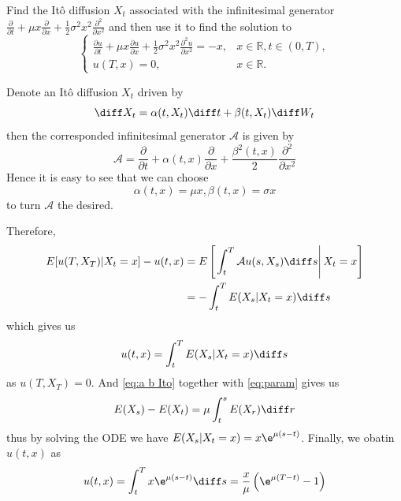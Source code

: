 \problem
\begin{question}
    Find the It\^o diffusion $X_t$ associated with the infinitesimal generator $\frac{\partial }{\partial t}+\mu x \frac{\partial }{\partial x}+\frac{1}{2}\sigma^2x^2 \frac{\partial^2}{\partial x^2}$ and then use it to find the solution to
    \begin{equation}
    \left\{
    \begin{array}{ll}
    \frac{\partial u}{\partial t}+\mu x \frac{\partial u}{\partial x}+\frac{1}{2}\sigma^2x^2 \frac{\partial^2 u}{\partial x^2}=-x,&x\in\mathbb R,t\in(0,T),\\
    u(T,x)=0,&x\in\mathbb R.
    \end{array}
    \right.
    \end{equation}
\end{question}
Denote an It\^o diffusion $X_t$ driven by
\begin{equation}
    \label{eq:a b Ito}
    \diff X_t=\alpha(t,X_t)\diff t+\beta(t,X_t)\diff W_t
\end{equation}
then the corresponded infinitesimal generator $\mathcal A$
is given by
\[\mathcal A=\frac{\partial}{\partial t}+\alpha(t,x)\frac{\partial}{\partial x}
+\frac{\beta^2(t,x)}{2}\frac{\partial^2}{\partial x^2}\]
Hence it is easy to see that we can choose
\begin{equation}
    \label{eq:param}
    \alpha(t,x)=\mu x,\beta(t,x)=\sigma x
\end{equation}
to turn $\mathcal A$ the desired.

Therefore,
\[\begin{aligned}
    E[u(T,X_T)|X_t=x]-u(t,x)
    &=E\left[\left.\int_t^T\mathcal Au(s,X_s)\diff s\right|
    X_t=x\right]\\
    &=-\int_t^TE(X_s|X_t=x)\diff s
\end{aligned}\]
which gives us
\[u(t,x)=\int_t^TE(X_s|X_t=x)\diff s\]
as $u(T,X_T)=0$.
And \cref{eq:a b Ito} together with \cref{eq:param} gives us
\[E(X_s)-E(X_t)=\mu\int_t^sE(X_r)\diff r\]
thus by solving the ODE we have $E(X_s|X_t=x)=x\e^{\mu(s-t)}$.
Finally, we obatin $u(t,x)$ as
\[u(t,x)=\int_t^Tx\e^{\mu(s-t)}\diff s
=\frac{x}{\mu}\left(\e^{\mu(T-t)}-1\right)\]

